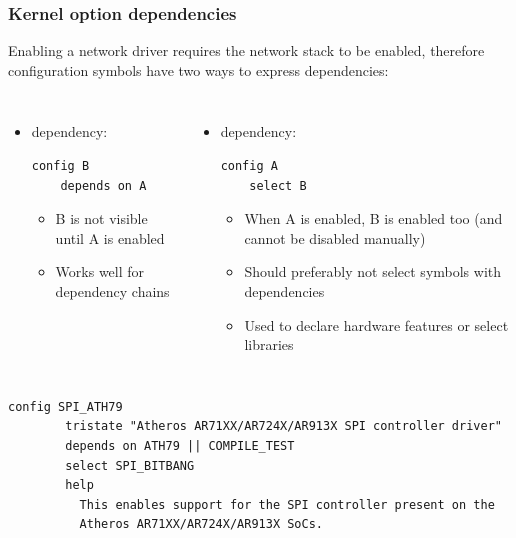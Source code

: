 \begin{frame}[fragile]
  \frametitle{Kernel option dependencies}
  Enabling a network driver requires the network stack to be enabled,
  therefore configuration symbols have two ways to express dependencies:
  \begin{columns}[T]
    \begin{itemize}
    \item {} dependency:
\scriptsize
\begin{verbatim}
config B
    depends on A
\end{verbatim}
      \begin{itemize}
      \item B is not visible until A is enabled
      \item Works well for dependency chains
      \end{itemize}
    \end{itemize}
    \begin{itemize}
    \item {} dependency:
\scriptsize
\begin{verbatim}
config A
    select B
\end{verbatim}
      \begin{itemize}
      \item When A is enabled, B is enabled too (and cannot be disabled
        manually)
      \item Should preferably not select symbols with 
        dependencies
      \item Used to declare hardware features or select libraries
      \end{itemize}
    \end{itemize}
  \end{columns}
  \vfill
  \scriptsize
\begin{verbatim}
config SPI_ATH79
        tristate "Atheros AR71XX/AR724X/AR913X SPI controller driver"
        depends on ATH79 || COMPILE_TEST
        select SPI_BITBANG
        help
          This enables support for the SPI controller present on the
          Atheros AR71XX/AR724X/AR913X SoCs.
\end{verbatim}
\end{frame}

